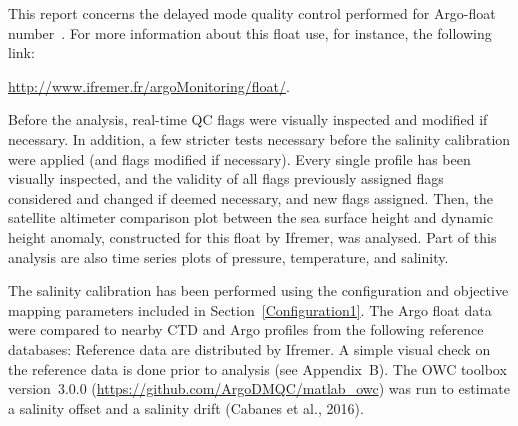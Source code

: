 \documentclass{article}
\begin{document}
This report concerns the delayed mode quality control performed for
Argo-float number~\WMOnum. For more information about this float use, for
instance, the following link:
\begin{center}
\href{url}{http://www.ifremer.fr/argoMonitoring/float/\WMOnum}.  
\end{center}
Before the analysis, real-time QC flags were visually inspected and
modified if necessary.  In addition, a few stricter tests necessary before
the salinity calibration were applied (and flags modified if necessary).
% 
Every single profile has been visually inspected, and the validity of all
flags previously assigned flags considered and changed if deemed
necessary, and new flags assigned.
%
Then, the satellite altimeter comparison plot between the sea surface
height and dynamic height anomaly, constructed for this float by Ifremer,
was analysed.
%
Part of this analysis are also time series plots of pressure, temperature,
and salinity.



The salinity calibration has been performed using the configuration and objective
mapping parameters included in Section~\ref{Configuration1}.
The Argo float data were compared to nearby CTD and Argo profiles from the
following reference databases: \small{{}}
%
Reference data are distributed by Ifremer. A simple visual check on the
reference data is done prior to analysis (see Appendix~B).
%
The OWC toolbox version~3.0.0 %
(\href{url}{https://github.com/ArgoDMQC/matlab\_owc}) was run to estimate
a salinity offset and a salinity drift (Cabanes et al., 2016).
\end{document}
